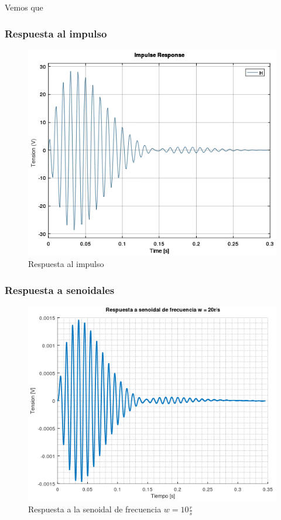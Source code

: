 \documentclass[11pt,a4paper]{report}
\begin{document}
Vemos que 

\newpage
\subsubsection*{Respuesta al impulso}

\begin{figure}[h!]
\includegraphics[scale=0.7]{RtaImpulso.png}
\caption{Respuesta al impulso}
\end{figure}

\newpage
\subsubsection*{Respuesta a senoidales}

\begin{figure}[h!]
\includegraphics[scale=1]{RtaSenoidalBajo.png}
\caption{Respuesta a la senoidal de frecuencia $w = 10\frac{r}{s}$}
\end{figure}
\end{document}
